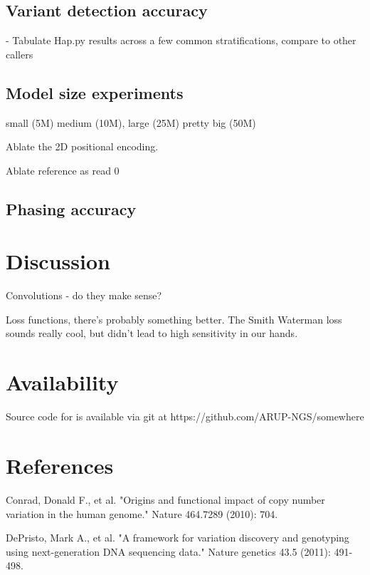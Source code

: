 \documentclass[]{article}
\begin{document}
\subsection{Variant detection accuracy}

 - Tabulate Hap.py results across a few common stratifications, compare to other callers




\subsection{Model size experiments}

 small (5M) medium (10M), large (25M) pretty big (50M)

 
 Ablate the 2D positional encoding.

 Ablate reference as read 0 
 
 \subsection{Phasing accuracy}



 \section{Discussion}
 
 Convolutions - do they make sense? 

 Loss functions, there's probably something better. The Smith Waterman loss sounds really cool, but didn't lead to high sensitivity in our hands. 
 
 \section{Availability}
 
 Source code for is available via git at https://github.com/ARUP-NGS/somewhere
 
 \section{References}
 
 \vspace{8pt}
 Conrad, Donald F., et al. "Origins and functional impact of copy number variation in the human genome." Nature 464.7289 (2010): 704.
 
\vspace{8pt}
DePristo, Mark A., et al. "A framework for variation discovery and genotyping using next-generation DNA sequencing data." Nature genetics 43.5 (2011): 491-498.
\end{document}
